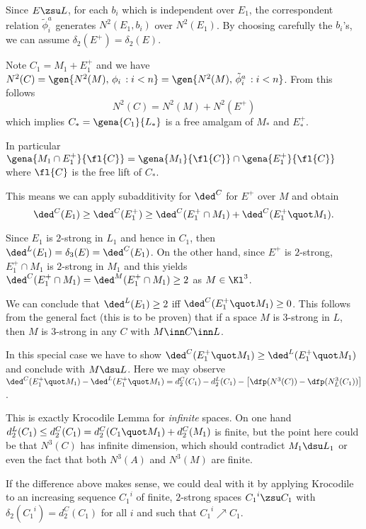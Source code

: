 \documentclass[a4paper,11pt,german,english]{article}
\begin{document}
\medskip
Since $E\zsu L$,  for each $b_{i}$ which is independent over $E_{1}$,
the correspondent relation $\tilde\phi ^{a}_{i}$ generates $N^{2}(E_{1},b_{i})$ over
$N^{2}(E_{1})$. By choosing carefully the $b_{i}$'s, we can assume $\delta_{2}(E^{+})=
\delta_{2}(E)$.

\medskip
Note $C_{1}=M_{1}+E_{1}^{+}$ and we have $N^{2}(C)=\gen{N^{2}(M),\,\phi_{i}\,:i<n}=\gen{N^{2}(M),\,\tilde\phi ^{a}_{i}\,:i<n}$. From this follows
$$N^{2}(C)=N^{2}(M)+N^{2}(E^{+})$$
which implies $C_{*}=\gena{C_{1}}{L_{*}}$ is a free amalgam of $M_{*}$ and $E^{+}_{*}$.

In particular
$\gena{M_{1}\cap E_{1}^{+}}{\fl{C}}=\gena{M_{1}}{\fl{C}}\cap\gena{E_{1}^{+}}{\fl{C}}$
where $\fl{C}$ is the free lift of $C_{*}$.

\medskip
This means we can apply subadditivity for $\ded^{C}$ for $E^{+}$ over $M$
and obtain
$$\ded^{C}(E_{1})\geq\ded^{C}(E_{1}^{+})\geq\ded^{C}(E_{1}^{+}\cap M_{1})+\ded^{C}(E_{1}^{+}\quot M_{1}).$$

Since $E_{1}$ is $2$-strong in $L_{1}$ and hence in $C_{1}$, then $\ded^{L}(E_{1})=\delta_{3}(E)=\ded^{C}(E_{1})$. On the other hand, since $E^{+}$ is $2$-strong, $E_{1}^{+}\cap M_{1}$ is $2$-strong in $M_{1}$ and this yields $\ded^{C}(E_{1}^{+}\cap M_{1})=\ded^{M}(E_{1}^{+}\cap M_{1})\geq2$ as $M\in\Kl^{3}$.

\medskip
We can conclude that $\ded^{L}(E_{1})\geq2$ iff $\ded^{C}(E_{1}^{+}\quot M_{1})\geq0$.
This follows from the general fact (this is to be proven) that if a space $M$ is $3$-strong
in $L$, then $M$ is $3$-strong in any $C$ with $M\inn C\inn L$.

In this special case we have to show $\ded^{C}(E_{1}^{+}\quot M_{1})\geq\ded^{L}(E_{1}^{+}\quot M_{1})$ and conclude with $M\dsu L$. Here we may observe
$\ded^{C}(E_{1}^{+}\quot M_{1})-\ded^{L}(E_{1}^{+}\quot M_{1})=
d_{2}^{C}(C_{1})-d_{2}^{L}(C_{1})-\left[  \dfp(N^{3}(C))-\dfp(N^{3}_{L}(C_{1}))  \right]$.

This is exactly  Krocodile Lemma for {\em infinite} spaces. On one hand 
$d_{2}^{L}(C_{1})\leq d_{2}^{C}(C_{1})=d_{2}^{C}(C_{1}\quot M_{1})+d_{2}^{C}(M_{1})$
is finite, but the point here could be that $N^{3}(C)$ has infinite dimension, which
should contradict $M_{1}\dsu L_{1}$ or even the fact that both $N^{3}(A)$ and $N^{3}(M)$
are finite.

If the difference above makes sense, we could deal with it by applying
Krocodile to an increasing sequence ${C_{1}}^{i}$ of finite, $2$-strong spaces ${C_{1}}^{i}\zsu C_{1}$ with $\delta_{2}({C_{1}}^{i})=d_{2}^{C}(C_{1})$ for all $i$ and such that ${C_{1}}^{i}\nearrow C_{1}$.
\end{document}
